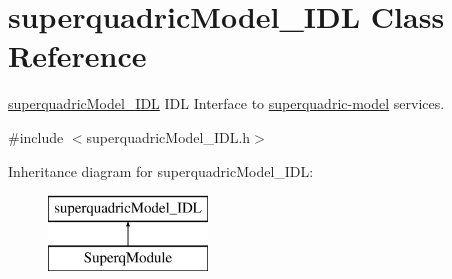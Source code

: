 \section{superquadric\+Model\+\_\+\+I\+DL Class Reference}
\label{classsuperquadricModel__IDL}


\mbox{\hyperlink{classsuperquadricModel__IDL}{superquadric\+Model\+\_\+\+I\+DL}} I\+DL Interface to \mbox{\hyperlink{group__superquadric-model}{superquadric-\/model}} services.  




{\ttfamily \#include $<$superquadric\+Model\+\_\+\+I\+D\+L.\+h$>$}

Inheritance diagram for superquadric\+Model\+\_\+\+I\+DL\+:\begin{figure}[H]
\begin{center}
\leavevmode
\includegraphics[height=2.000000cm]{classsuperquadricModel__IDL}
\end{center}
\end{figure}
